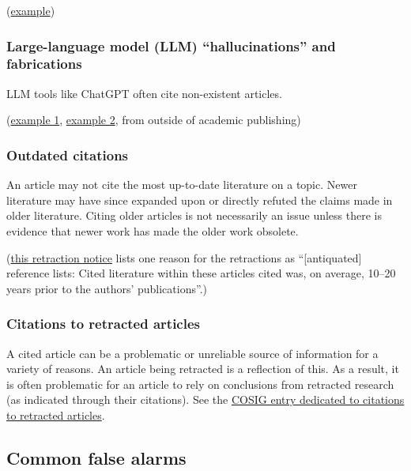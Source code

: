 \documentclass[letterpaper, 12pt]{article}
\begin{document}
(\href{https://pubpeer.com/publications/CF328DB7A6131B99F9805B49643D81\#2}{example})

\subsubsection*{Large-language model (LLM) ``hallucinations'' and fabrications}

LLM tools like ChatGPT often cite non-existent articles.

(\href{https://pubpeer.com/publications/8D6BF963665181144EC553BE2FDA92\#2}{example 1},
\href{https://web.archive.org/web/20230623093222/https://www.theguardian.com/technology/2023/jun/23/two-us-lawyers-fined-submitting-fake-court-citations-chatgpt}{example 2}, from outside of academic publishing)

\subsubsection*{Outdated citations}

An article may not cite the most up-to-date literature on a topic. Newer literature may have since expanded upon or directly refuted the claims made in older literature. Citing older articles is not necessarily an issue unless there is evidence that newer work has made the older work obsolete.

(\href{https://doi.org/10.1177/00315125241311636}{this retraction notice} lists one reason for the retractions as ``[antiquated] reference lists: Cited literature within these articles cited was, on average, 10–20 years prior to the authors’ publications''.)

\subsubsection*{Citations to retracted articles}

A cited article can be a problematic or unreliable source of information for a variety of reasons. An article being retracted is a reflection of this. As a result, it is often problematic for an article to rely on conclusions from retracted research (as indicated through their citations). See the \href{https://osf.io/9q3as}{COSIG entry dedicated to citations to retracted articles}.

\subsection*{Common false alarms}
\end{document}
